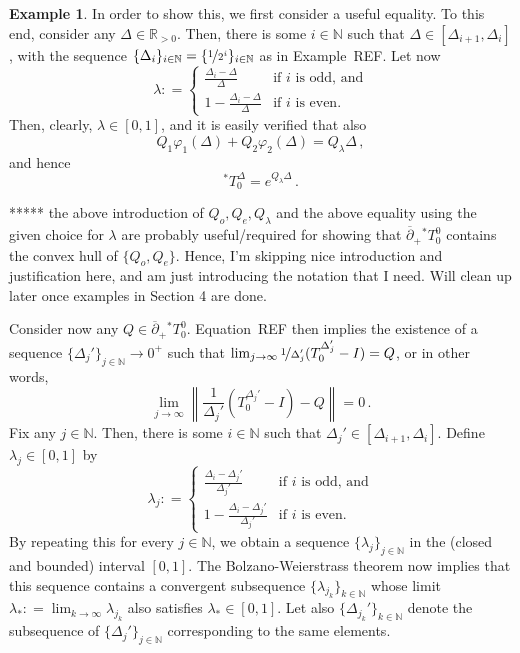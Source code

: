 \documentclass[10pt,a4paper]{paper}
\theoremstyle{definition}
\newtheorem{exmp}{Example}%
\newcommand{\nats}{\mathbb{N}}
\newcommand{\reals}{\mathbb{R}}
\newcommand{\realspos}{\reals_{>0}}
\newcommand{\norm}[1]{\left\lVert #1 \right\rVert}
\newcommand{\coloneqq}{:\!=}
\begin{document}
\begin{exmp}
In order to show this, we first consider a useful equality. To this end, consider any $\Delta\in\realspos$. Then, there is some $i\in\nats$ such that $\Delta\in[\Delta_{i+1},\Delta_i]$, with the sequence $\{\Delta_i\}_{i\in\nats}=\{\nicefrac{1}{2^i}\}_{i\in\nats}$ as in Example~REF. Let now
\begin{equation*}
\lambda \coloneqq \left\{ \begin{array}{ll}
\frac{\Delta_i - \Delta}{\Delta} & \text{if $i$ is odd, and} \\
1 - \frac{\Delta_i - \Delta}{\Delta} & \text{if $i$ is even.}
\end{array}\right.
\end{equation*}
Then, clearly, $\lambda\in[0,1]$, and it is easily verified that also
\begin{equation*}
Q_1\varphi_1(\Delta) + Q_2\varphi_2(\Delta) = Q_\lambda\Delta\,,
\end{equation*}
and hence
\begin{equation*}
{}^*T_0^\Delta = e^{Q_\lambda\Delta}\,.
\end{equation*}

***** the above introduction of $Q_o,Q_e,Q_\lambda$ and the above equality using the given choice for $\lambda$ are probably useful/required for showing that $\overline{\partial}_+{}^*T_0^0$ contains the convex hull of $\{Q_o,Q_e\}$. Hence, I'm skipping nice introduction and justification here, and am just introducing the notation that I need. Will clean up later once examples in Section 4 are done.

Consider now any $Q\in\overline{\partial}_+{}^*T_0^0$. Equation~REF then implies the existence of a sequence $\{\Delta_j'\}_{j\in\nats}\to 0^+$ such that $\lim_{j\to\infty}\nicefrac{1}{\Delta_j'}(T_0^{\Delta_j'}-I)=Q$, or in other words,
\begin{equation}
\lim_{j\to\infty} \norm{\frac{1}{\Delta_j'}\left(T_0^{\Delta_j'}-I\right)-Q} = 0\,.
\end{equation}
Fix any $j\in\nats$. Then, there is some $i\in\nats$ such that $\Delta_j'\in[\Delta_{i+1},\Delta_i]$. Define $\lambda_j\in[0,1]$ by
\begin{equation*}
\lambda_j \coloneqq \left\{ \begin{array}{ll}
\frac{\Delta_i - \Delta_ j'}{\Delta_j'} & \text{if $i$ is odd, and} \\
1 - \frac{\Delta_i - \Delta_j'}{\Delta_j'} & \text{if $i$ is even.}
\end{array}\right.
\end{equation*}
By repeating this for every $j\in\nats$, we obtain a sequence $\{\lambda_j\}_{j\in\nats}$ in the (closed and bounded) interval $[0,1]$. The Bolzano-Weierstrass theorem now implies that this sequence contains a convergent subsequence $\{\lambda_{j_k}\}_{k\in\nats}$ whose limit $\lambda_*\coloneqq \lim_{k\to\infty}\lambda_{j_k}$ also satisfies $\lambda_*\in[0,1]$. Let also $\{\Delta_{j_k}'\}_{k\in\nats}$ denote the subsequence of $\{\Delta_{j}'\}_{j\in\nats}$ corresponding to the same elements.


\end{exmp}
\end{document}

